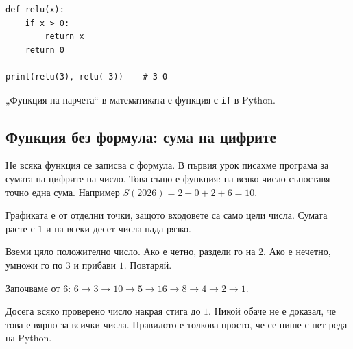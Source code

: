 \documentclass[11pt,a4paper]{article}
\begin{document}
\begin{pybox}
\begin{Verbatim}
def relu(x):
    if x > 0:
        return x
    return 0

print(relu(3), relu(-3))    # 3 0
\end{Verbatim}
„Функция на парчета“ в математиката е функция с \texttt{if} в Python.
\end{pybox}

\subsection{Функция без формула: сума на цифрите}

Не всяка функция се записва с формула. В първия урок писахме програма за сумата на цифрите на число.
Това също е функция: на всяко число съпоставя точно една сума. Например $S(2026)=2+0+2+6=10$.

\begin{center}
\end{center}

Графиката е от отделни точки, защото входовете са само цели числа. Сумата расте с $1$ и на всеки десет числа пада рязко.

\begin{funbox}
Вземи цяло положително число. Ако е четно, раздели го на $2$. Ако е нечетно, умножи го по $3$ и прибави $1$. Повтаряй.

Започваме от $6$: \quad $6 \to 3 \to 10 \to 5 \to 16 \to 8 \to 4 \to 2 \to 1$.

Досега всяко проверено число накрая стига до $1$. Никой обаче не е доказал, че това е вярно за всички числа. Правилото е толкова просто, че се пише с пет реда на Python.
\end{funbox}
\end{document}
